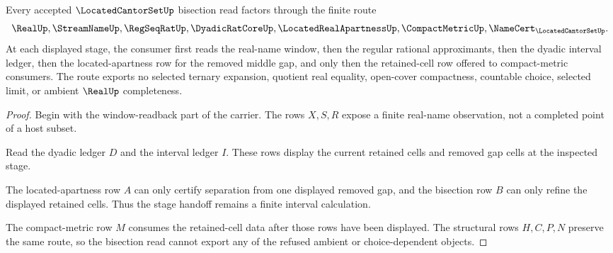 \begin{theorem}
\label{thm:located-cantor-set-bisection-route}
Every accepted $\LocatedCantorSetUp$ bisection read factors through the finite route
$$
\RealUp,\StreamNameUp,\RegSeqRatUp,\DyadicRatCoreUp,\LocatedRealApartnessUp,\CompactMetricUp,\NameCert_{\LocatedCantorSetUp}.
$$
At each displayed stage, the consumer first reads the real-name window, then the regular rational approximants, then the dyadic interval ledger, then the located-apartness row for the removed middle gap, and only then the retained-cell row offered to compact-metric consumers. The route exports no selected ternary expansion, quotient real equality, open-cover compactness, countable choice, selected limit, or ambient $\RealUp$ completeness.
\end{theorem}
\begin{proof}
Begin with the window-readback part of the carrier. The rows $X,S,R$ expose a finite real-name observation, not a completed point of a host subset.

Read the dyadic ledger $D$ and the interval ledger $I$. These rows display the current retained cells and removed gap cells at the inspected stage.

The located-apartness row $A$ can only certify separation from one displayed removed gap, and the bisection row $B$ can only refine the displayed retained cells. Thus the stage handoff remains a finite interval calculation.

The compact-metric row $M$ consumes the retained-cell data after those rows have been displayed. The structural rows $H,C,P,N$ preserve the same route, so the bisection read cannot export any of the refused ambient or choice-dependent objects.
\end{proof}


